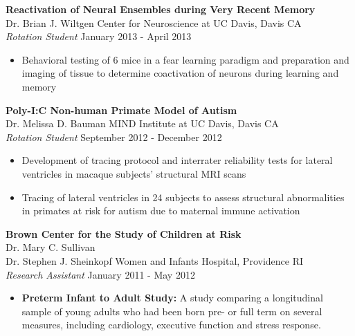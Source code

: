 \documentclass[line,margin,10pt]{res}
\begin{document}
\begin{resume}
\begin{itemize}
\end{itemize}
\textbf{Reactivation of Neural Ensembles during Very Recent Memory}\\
Dr. Brian J. Wiltgen \hfill Center for Neuroscience at UC Davis, Davis CA\\{\sl Rotation Student} \hfill January 2013 - April 2013
\begin{itemize} \itemsep -2pt
\item Behavioral testing of 6 mice in a fear learning paradigm and preparation and imaging of tissue to determine coactivation of neurons during learning and memory
\end{itemize}
\textbf{Poly-I:C Non-human Primate Model of Autism}\\
Dr. Melissa D. Bauman \hfill MIND Institute at UC Davis, Davis CA\\{\sl Rotation Student} \hfill September 2012 - December 2012
\begin{itemize} \itemsep -2pt
\item Development of tracing protocol and interrater reliability tests for lateral ventricles in macaque subjects' structural MRI scans
\item Tracing of lateral ventricles in 24 subjects to assess structural abnormalities in primates at risk for autism due to maternal immune activation
\end{itemize}
\textbf{Brown Center for the Study of Children at Risk}\\
Dr. Mary C. Sullivan \\ Dr. Stephen J. Sheinkopf \hfill Women and Infants Hospital, Providence RI\\
{\sl Research Assistant} \hfill January 2011 - May 2012 
	\begin{itemize} \itemsep -2pt
	\item \textbf{Preterm Infant to Adult Study:}  A study comparing a longitudinal sample of young adults who had been born pre- or full term  on several measures, including cardiology, executive function and stress response.

\end{itemize}
\end{resume}
\end{document}
